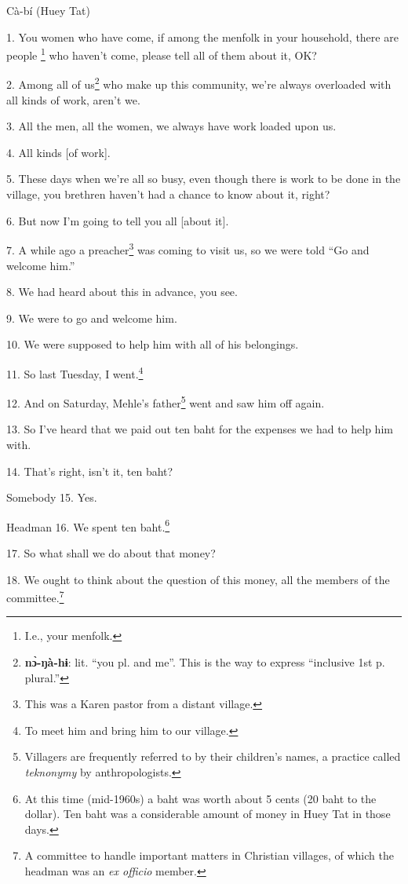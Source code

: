 \setcounter{footnote}{0}

Cà-bí (Huey Tat)

1. You women who have come, if among the menfolk in your household, there are people
\footnote{I.e., your menfolk.} who haven't come, please tell all of them about it, OK?

2. Among all of us\footnote{\textbf{nɔ̀-ŋà-hɨ}: lit. ``you pl. and me''. This is the way to express ``inclusive 1st p. plural.''} who make up this community, we're always overloaded with
all kinds of work, aren't we.

3. All the men, all the women, we always have work loaded upon us.

4. All kinds [of work].

5. These days when we're all so busy, even though there is work to be done in the
village, you brethren haven't had a chance to know about it, right?

6. But now I'm going to tell you all [about it].

7. A while ago a preacher\footnote{This was a Karen pastor from a distant village.} was coming to visit us, so we were told ``Go and
welcome him.''

8. We had heard about this in advance, you see.

9. We were to go and welcome him.

10. We were supposed to help him with all of his belongings.

11. So last Tuesday, I went.\footnote{To meet him and bring him to our village.}

12. And on Saturday, Mehle's father\footnote{Villagers are frequently referred to by their children's names, a practice called \textit{teknonymy} by anthropologists.} went and saw him off again.

13. So I've heard that we paid out ten baht for the expenses we had to help him
with.

14. That's right, isn't it, ten baht?

Somebody 15. Yes.

Headman 16. We spent ten baht.\footnote{At this time (mid-1960s) a baht was worth about 5 cents (20 baht to the dollar). Ten baht was a considerable amount of money in Huey Tat in those days.}

17. So what shall we do about that money?

18. We ought to think about the question of this money, all the members of the
committee.\footnote{A committee to handle important matters in Christian villages, of which the headman was an \textit{ex officio} member.}

